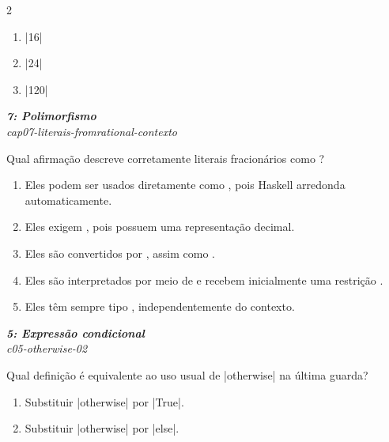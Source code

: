 \documentclass[a4paper,10pt,brazil]{article}
\begin{document}
\begin{multicols}{2}
\begin{enumerate}
  \item \haskellinline|16|

  \item \haskellinline|24|

  \item \haskellinline|120|


\end{enumerate}

\begin{flushright}
  \footnotesize
  \textit{\textbf{7: Polimorfismo}}\\
  \textit{cap07-literais-fromrational-contexto}\\

\end{flushright}
Qual afirmação descreve corretamente literais fracionários como ?
\begin{enumerate}
  \item Eles podem ser usados diretamente como , pois Haskell arredonda automaticamente.
  \item Eles exigem , pois possuem uma representação decimal.
  \item Eles são convertidos por , assim como .
  \item Eles são interpretados por meio de  e recebem inicialmente uma restrição .
  \item Eles têm sempre tipo , independentemente do contexto.

\end{enumerate}

\begin{flushright}
  \footnotesize
  \textit{\textbf{5: Expressão condicional}}\\
  \textit{c05-otherwise-02}\\

\end{flushright}
Qual definição é equivalente ao uso usual de \haskellinline|otherwise| na última guarda?

\begin{enumerate}
  \item Substituir \haskellinline|otherwise| por \haskellinline|True|.

  \item Substituir \haskellinline|otherwise| por \haskellinline|else|.


\end{enumerate}
\end{multicols}
\end{document}
